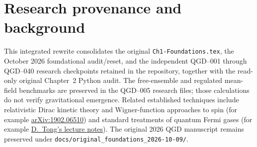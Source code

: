 \documentclass[11pt,a4paper]{article}
\begin{document}
\section*{Research provenance and background}
This integrated rewrite consolidates the original \texttt{Ch1-Foundations.tex}, the October 2026 foundational audit/reset, and the independent QGD--001 through QGD--040 research checkpoints retained in the repository, together with the read-only original Chapter~2 Python audit. The free-ensemble and regulated mean-field benchmarks are preserved in the QGD--005 research files; those calculations do not verify gravitational emergence. Related established techniques include relativistic Dirac kinetic theory and Wigner-function approaches to spin (for example \href{https://arxiv.org/abs/1902.06510}{arXiv:1902.06510}) and standard treatments of quantum Fermi gases (for example \href{https://www.damtp.cam.ac.uk/user/tong/statphys/statmechhtml/S3.html}{D.~Tong's lecture notes}). The original 2026 QGD manuscript remains preserved under \texttt{docs/original\_foundations\_2026-10-09/}.
\end{document}

